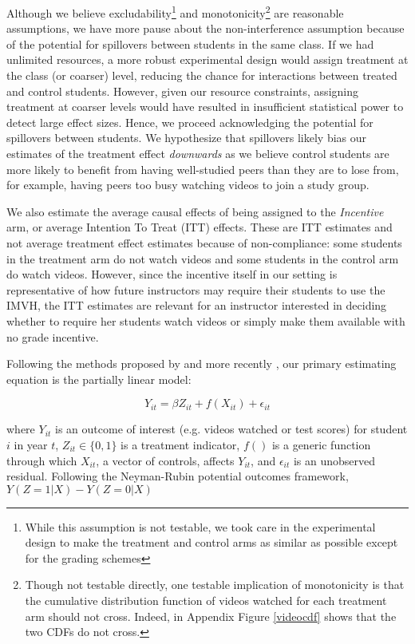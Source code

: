\documentclass[12pt]{article}
\begin{document}
Although we believe excludability\footnote{While this assumption is not testable, we took care in the experimental design to make the treatment and control arms as similar as possible except for the grading schemes} and monotonicity\footnote{Though not testable directly, one testable implication of monotonicity is that the cumulative distribution function of videos watched for each treatment arm should not cross. Indeed, in Appendix Figure \ref{videocdf} shows that the two CDFs do not cross.} are reasonable assumptions, we have more pause about the non-interference assumption because of the potential for spillovers between students in the same class. If we had unlimited resources, a more robust experimental design would assign treatment at the class (or coarser) level, reducing the chance for interactions between treated and control students. However, given our resource constraints, assigning treatment at coarser levels would have resulted in insufficient statistical power to detect large effect sizes. Hence, we proceed acknowledging the potential for spillovers between students. We hypothesize that spillovers likely bias our estimates of the treatment effect \textit{downwards} as we believe control students are more likely to benefit from having well-studied peers than they are to lose from, for example, having peers too busy watching videos to join a study group.

We also estimate the average causal effects of being assigned to the \textit{Incentive} arm, or average Intention To Treat (ITT) effects. These are ITT estimates and not average treatment effect estimates because of non-compliance: some students in the treatment arm do not watch videos and some students in the control arm do watch videos. However, since the incentive itself in our setting is representative of how future instructors may require their students to use the IMVH, the ITT estimates are relevant for an instructor interested in deciding whether to require her students watch videos or simply make them available with no grade incentive.

Following the methods proposed by \textcite{robinson1988} and more recently \textcite{wa2018}, our primary estimating equation is the partially linear model:

\begin{equation}
	Y_{it} = \beta Z_{it} + f(X_{it}) + \epsilon_{it}
\end{equation}

where $Y_{it}$ is an outcome of interest (e.g. videos watched or test scores) for student $i$ in year $t$, $Z_{it} \in \{0,1\}$ is a treatment indicator, $f()$ is a generic function through which $X_{it}$, a vector of controls, affects $Y_{it}$, and $\epsilon_{it}$ is an unobserved residual. Following the Neyman-Rubin potential outcomes framework, $Y(Z=1|X) - Y(Z=0|X)$
\end{document}
